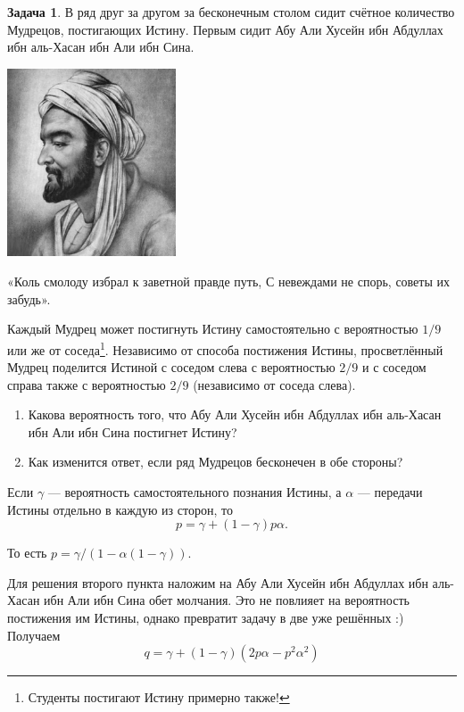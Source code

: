 \documentclass[nobib]{tufte-handout}
\theoremstyle{definition}
\newtheorem{problem}{Задача}
\begin{document}
\begin{problem}
В ряд друг за другом за бесконечным столом сидит счётное количество Мудрецов, постигающих Истину. Первым сидит Абу Али Хусейн ибн Абдуллах ибн аль-Хасан ибн Али ибн Сина.
\begin{marginfigure}
  \includegraphics[width=5cm]{images/abu_ali.jpg}
  \caption{«Коль смолоду избрал к заветной правде путь,
С невеждами не спорь, советы их забудь». }
\end{marginfigure}

Каждый Мудрец может постигнуть Истину самостоятельно с вероятностью $1/9$ или же от соседа\footnote{Студенты постигают Истину примерно также!}. Независимо от способа постижения Истины, просветлённый Мудрец поделится Истиной с соседом слева с вероятностью $2/9$ и с соседом справа также с вероятностью $2/9$ (независимо от соседа слева).


\begin{enumerate}
\item Какова вероятность того, что Абу Али Хусейн ибн Абдуллах ибн аль-Хасан ибн Али ибн Сина постигнет Истину?
\item Как изменится ответ, если ряд Мудрецов бесконечен в обе стороны?
\end{enumerate}

\begin{sol}
Если $\gamma$ — вероятность самостоятельного познания Истины, а $\alpha$ — передачи Истины отдельно в каждую из сторон, то
\[
p = \gamma + (1-\gamma) p \alpha.
\]

То есть $p=\gamma/(1-\alpha(1-\gamma))$.

Для решения второго пункта наложим на Абу Али Хусейн ибн Абдуллах ибн аль-Хасан ибн Али ибн Сина обет молчания. Это не повлияет на вероятность постижения им Истины, однако превратит задачу в две уже решённых :) Получаем
\[
q = \gamma + (1-\gamma)(2p\alpha - p^2\alpha^2)
\]

\end{sol}

\end{problem}
\end{document}
